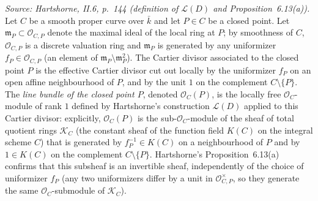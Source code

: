 \begin{definition}



  \label{def:lineBundleAtClosedPoint}
  
  \textit{Source: Hartshorne, II.6, p.~144 (definition of
  \(\mathscr L(D)\) and Proposition~6.13(a)).}
  Let \(C\) be a smooth proper curve over \(\bar k\) and let \(P \in C\) be a
  closed point. Let \(\mathfrak m_P \subset \mathcal O_{C, P}\) denote the
  maximal ideal of the local ring at \(P\); by smoothness of \(C\),
  \(\mathcal O_{C, P}\) is a discrete valuation ring and \(\mathfrak m_P\)
  is generated by any uniformizer \(f_P \in \mathcal O_{C, P}\) (an
  element of \(\mathfrak m_P \setminus \mathfrak m_P^2\)). The Cartier
  divisor associated to the closed point \(P\) is the effective
  Cartier divisor cut out locally by the uniformizer \(f_P\) on an open
  affine neighbourhood of \(P\), and by the unit \(1\) on the complement
  \(C \setminus \{P\}\). The \emph{line bundle of the closed point \(P\)},
  denoted \(\mathcal O_C(P)\), is the locally free \(\mathcal O_C\)-module
  of rank \(1\) defined by Hartshorne's construction \(\mathscr L(D)\)
  applied to this Cartier divisor: explicitly, \(\mathcal O_C(P)\) is the
  sub-\(\mathcal O_C\)-module of the sheaf of total quotient rings
  \(\mathcal K_C\) (the constant sheaf of the function field \(K(C)\) on the
  integral scheme \(C\)) that is generated by \(f_P^{-1} \in K(C)\) on a
  neighbourhood of \(P\) and by \(1 \in K(C)\) on the complement
  \(C \setminus \{P\}\). Hartshorne's Proposition~6.13(a) confirms that
  this subsheaf is an invertible sheaf, independently of the choice of
  uniformizer \(f_P\) (any two uniformizers differ by a unit in
  \(\mathcal O_{C, P}^{\times}\), so they generate the same
  \(\mathcal O_C\)-submodule of \(\mathcal K_C\)).


\end{definition}

